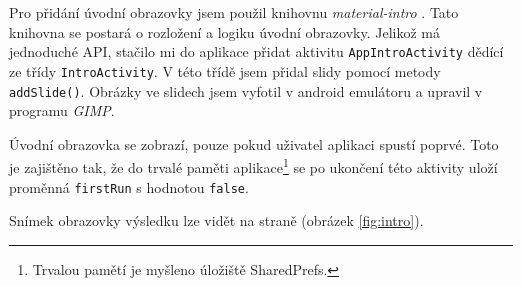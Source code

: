 \documentclass[../TakeYourPill.tex]{subfiles}
\begin{document}
Pro přidání úvodní obrazovky jsem použil knihovnu \textit{material-intro} \cite{intro}. Tato knihovna se postará o rozložení a logiku úvodní obrazovky. Jelikož má jednoduché API, stačilo mi do aplikace přidat aktivitu \texttt{AppIntroActivity} dědící ze třídy \texttt{IntroActivity}. V této třídě jsem přidal slidy pomocí metody \texttt{addSlide()}. Obrázky ve slidech jsem vyfotil v android emulátoru a upravil v programu \textit{GIMP}.

Úvodní obrazovka se zobrazí, pouze pokud uživatel aplikaci spustí poprvé. Toto je zajištěno tak, že do trvalé paměti aplikace\footnote{Trvalou pamětí je myšleno úložiště SharedPrefs.} se po ukončení této aktivity uloží proměnná \texttt{firstRun} s hodnotou \texttt{false}.

Snímek obrazovky výsledku lze vidět na straně \pageref{fig:intro} (obrázek \ref{fig:intro}).
\end{document}
